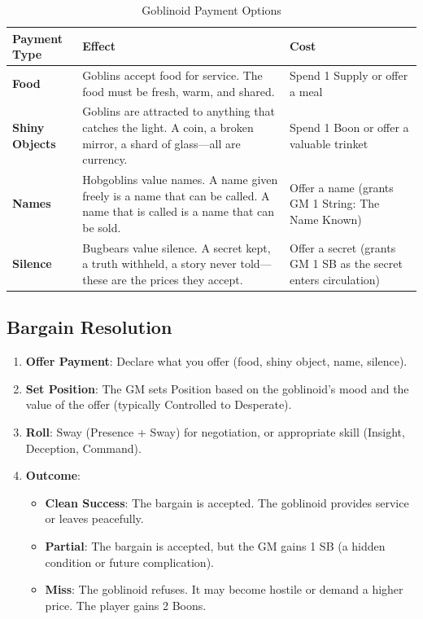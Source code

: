 \begin{table}[h]
\centering
\begin{tabular}{|l|l|l|}
\hline
\textbf{Payment Type} & \textbf{Effect} & \textbf{Cost} \\
\hline
\textbf{Food} & Goblins accept food for service. The food must be fresh, warm, and shared. & Spend 1 Supply or offer a meal \\
\textbf{Shiny Objects} & Goblins are attracted to anything that catches the light. A coin, a broken mirror, a shard of glass---all are currency. & Spend 1 Boon or offer a valuable trinket \\
\textbf{Names} & Hobgoblins value names. A name given freely is a name that can be called. A name that is called is a name that can be sold. & Offer a name (grants GM 1 String: The Name Known) \\
\textbf{Silence} & Bugbears value silence. A secret kept, a truth withheld, a story never told---these are the prices they accept. & Offer a secret (grants GM 1 SB as the secret enters circulation) \\
\hline
\end{tabular}
\caption{Goblinoid Payment Options}
\end{table}

\subsection{Bargain Resolution}

\begin{enumerate}
    \item \textbf{Offer Payment}: Declare what you offer (food, shiny object, name, silence).
    \item \textbf{Set Position}: The GM sets Position based on the goblinoid's mood and the value of the offer (typically Controlled to Desperate).
    \item \textbf{Roll}: Sway (Presence + Sway) for negotiation, or appropriate skill (Insight, Deception, Command).
    \item \textbf{Outcome}:
    \begin{itemize}
        \item \textbf{Clean Success}: The bargain is accepted. The goblinoid provides service or leaves peacefully.
        \item \textbf{Partial}: The bargain is accepted, but the GM gains 1 SB (a hidden condition or future complication).
        \item \textbf{Miss}: The goblinoid refuses. It may become hostile or demand a higher price. The player gains 2 Boons.
    \end{itemize}
\end{enumerate}

